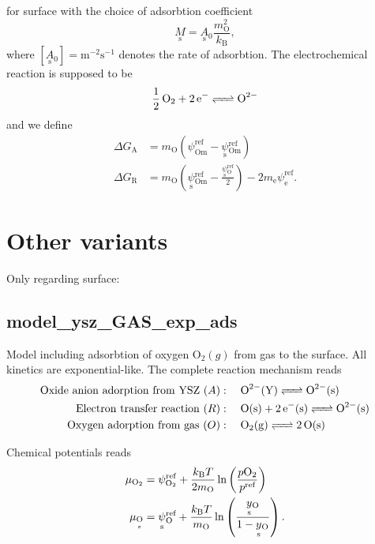 \documentclass{article}
\numberwithin{equation}{section}
\newcommand{\us}[1]{\underset{\textrm{s}}{#1}{}}
\def\kB{k_\mathrm{B}}
\def\Ox{\mathrm{O}}
\newcommand{\OO}{{\ce{O2}}}
\def\yOs{\us y_\textrm{O}}
\def\pO2{p\OO}
\def\DGA{\Delta G_\textrm{A}  }
\def\DGR{\Delta G_\textrm{R}  }
\def\REF{\textrm{ref}}
\begin{document}
for surface with the choice of adsorbtion coefficient
$$
\us M = \us A_0  \frac{m_\Ox^2}{\kB},
$$
where $[\us A_0] = \textrm{m}^{-2} \textrm{s}^{-1}$ denotes the rate of adsorbtion. The electrochemical reaction is supposed to be
\begin{align}
\ce{\frac{1}{2} \Ox_2 + 2\textrm{e}^- <=> \Ox^{2-}}
\end{align}
and we define
\begin{subequations}
\begin{align}
\DGA
&=
m_\Ox
\left(
	\psi_{\textrm{Om}}^\REF
	-
	\us \psi_{\textrm{Om}}^\REF
\right)
\\
\DGR
&= 
m_\Ox
\left(
	\us \psi_{\textrm{Om}}^\REF
	-
	\frac{\us \psi_{\Ox}^\REF}{2}
\right)
-
2 m_\textrm{e} \psi_{\textrm{e}}^\REF.
\end{align}
\end{subequations}




\section{Other variants}
Only regarding surface:

\newcommand{\surf}{\mathrm{s}}
\newcommand{\Y}{\mathrm{Y}}
\newcommand{\gas}{\mathrm{g}}
\subsection{model\_ysz\_GAS\_exp\_ads}
Model including adsorbtion of oxygen $\mathrm{O}_2(g)$ from gas to the surface. All kinetics are exponential-like. The complete reaction mechanism reads
\begin{subequations}
\begin{align}
\mathrm{Oxide \ anion \ adorption \ from \ YSZ} \ (A) &: \quad 
\ce{\Ox^{2-}(\Y) <=> \Ox^{2-}(\surf)}
\\
\mathrm{Electron \ transfer \ reaction}\ (R) &: \quad 
\ce{\textrm{O}(\surf) +  2\textrm{e}^-(\surf) <=> \Ox^{2-}(\surf)}
\\
\mathrm{Oxygen \ adorption \ from \ gas}\  (O) &: \quad 
\ce{\Ox_2({\gas}) <=> 2 \Ox(\surf)}
\\
\end{align}
\end{subequations}

Chemical potentials reads
\begin{subequations}
\begin{align}
\mu_{\OO} &= \psi_{\OO}^\REF + \frac{\kB T}{2 m_\Ox}\ln 
\left( 
    \frac{\pO2}{p^\REF} 
\right)
\\
\mu_{\us \Ox} 
&= 
\us \psi_{\Ox}^\REF 
+ 
\frac{\kB T}{m_\Ox} \ln 
\left(  
	\frac{\yOs}{1-\yOs}
\right).
\end{align}
\end{subequations}
\end{document}

